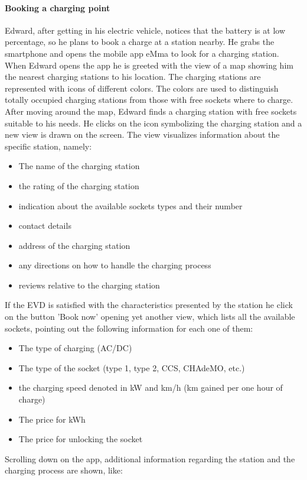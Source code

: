 \paragraph{Booking a charging point}
Edward, after getting in his electric vehicle, notices that the battery is at low percentage, so he plans to book a charge at a station nearby. He grabs the smartphone and opens the mobile app eMma to look for a charging station. When Edward opens the app he is greeted with the view of a map showing him the nearest charging stations to his location. The charging stations are represented with icons of different colors. The colors are used to distinguish totally occupied charging stations from those with free sockets where to charge. After moving around the map, Edward finds a charging station with free sockets suitable to his needs. He clicks on the icon symbolizing the charging station and a new view is drawn on the screen. The view visualizes information about the specific station, namely:
\begin{itemize}
    \item The name of the charging station
    \item the rating of the charging station
    \item indication about the available sockets types and their number
    \item contact details
    \item address of the charging station
    \item any directions on how to handle the charging process
    \item reviews relative to the charging station
\end{itemize}
If the EVD is satisfied with the characteristics presented by the station he click on the button 'Book now' opening yet another view, which lists all the available sockets, pointing out the following information for each one of them:
\begin{itemize}
    \item The type of charging (AC/DC)
    \item The type of the socket (type 1, type 2, CCS, CHAdeMO, etc.)
    \item the charging speed denoted in kW and km/h (km gained per one hour of charge)
    \item The price for kWh
    \item The price for unlocking the socket
\end{itemize}
Scrolling down on the app, additional information regarding the station and the charging process are shown, like:
